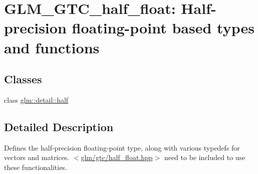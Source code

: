 \hypertarget{group__gtc__half__float}{\section{\-G\-L\-M\-\_\-\-G\-T\-C\-\_\-half\-\_\-float\-: \-Half-\/precision floating-\/point based types and functions}
\label{group__gtc__half__float}
}
\subsection*{\-Classes}
\begin{DoxyCompactItemize}
\item 
class \hyperlink{classglm_1_1detail_1_1half}{glm\-::detail\-::half}
\end{DoxyCompactItemize}


\subsection{\-Detailed \-Description}
\-Defines the half-\/precision floating-\/point type, along with various typedefs for vectors and matrices. $<$\hyperlink{half__float_8hpp}{glm/gtc/half\-\_\-float.\-hpp}$>$ need to be included to use these functionalities. 